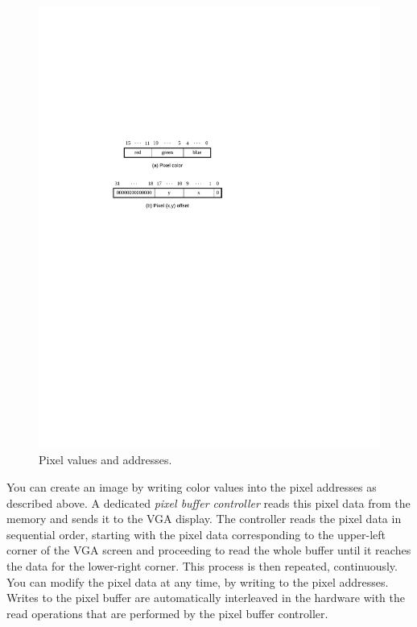 \documentclass[epsfig,10pt,fullpage]{article}
\begin{document}
\begin{figure}[h!]
   \begin{center}
       \includegraphics{figures/fig_pixels.pdf}
   \end{center}
   \caption{Pixel values and addresses.}
	\label{fig:pixels}
\end{figure}

You can create an image by writing color values into the pixel addresses as described
above. A dedicated {\it pixel buffer controller} reads this pixel data from the memory and 
sends it to the VGA display.  The controller reads the pixel data in sequential order, 
starting with the pixel data corresponding to the upper-left corner of the VGA screen and 
proceeding to read the whole buffer until it reaches the data for the lower-right corner. This 
process is then repeated, continuously.  You can modify the pixel data at any time, by writing 
to the pixel addresses. Writes to the pixel buffer are automatically interleaved in the 
hardware with the read operations that are performed by the pixel buffer controller. 
\end{document}
